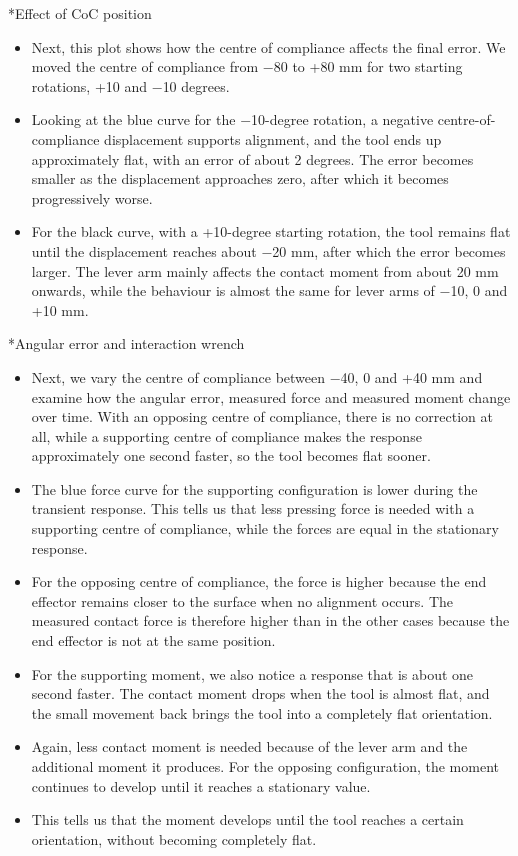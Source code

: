 \documentclass[12pt,a4paper]{article}
\makeatletter
\renewcommand\section{\@startsection{section}{1}{0pt}{14pt}{6pt}{\normalfont\Large\bfseries\color{navy}}}
\makeatother
\begin{document}
\section*{Effect of CoC position}
\begin{itemize}
\item Next, this plot shows how the centre of compliance affects the final error. We moved the centre of compliance from \ensuremath{-}80 to +80 mm for two starting rotations, +10 and \ensuremath{-}10 degrees.
\item Looking at the blue curve for the \ensuremath{-}10-degree rotation, a negative centre-of-compliance displacement supports alignment, and the tool ends up approximately flat, with an error of about 2 degrees. The error becomes smaller as the displacement approaches zero, after which it becomes progressively worse.
\item For the black curve, with a +10-degree starting rotation, the tool remains flat until the displacement reaches about \ensuremath{-}20 mm, after which the error becomes larger. The lever arm mainly affects the contact moment from about 20 mm onwards, while the behaviour is almost the same for lever arms of \ensuremath{-}10, 0 and +10 mm.
\end{itemize}

\section*{Angular error and interaction wrench}
\begin{itemize}
\item Next, we vary the centre of compliance between \ensuremath{-}40, 0 and +40 mm and examine how the angular error, measured force and measured moment change over time. With an opposing centre of compliance, there is no correction at all, while a supporting centre of compliance makes the response approximately one second faster, so the tool becomes flat sooner.
\item The blue force curve for the supporting configuration is lower during the transient response. This tells us that less pressing force is needed with a supporting centre of compliance, while the forces are equal in the stationary response.
\item For the opposing centre of compliance, the force is higher because the end effector remains closer to the surface when no alignment occurs. The measured contact force is therefore higher than in the other cases because the end effector is not at the same position.
\item For the supporting moment, we also notice a response that is about one second faster. The contact moment drops when the tool is almost flat, and the small movement back brings the tool into a completely flat orientation.
\item Again, less contact moment is needed because of the lever arm and the additional moment it produces. For the opposing configuration, the moment continues to develop until it reaches a stationary value.
\item This tells us that the moment develops until the tool reaches a certain orientation, without becoming completely flat.
\end{itemize}
\end{document}
